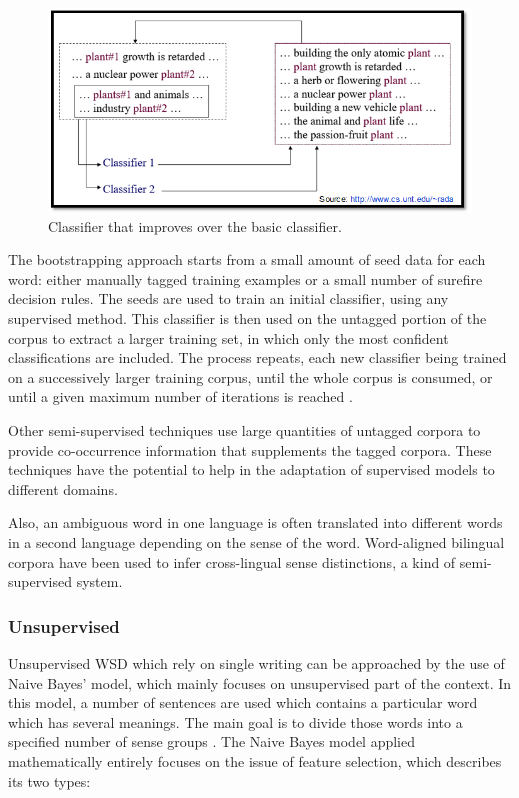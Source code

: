 \begin{figure}[tbh]
	\begin{center}
		\includegraphics[width=\columnwidth]{Union_Background_Chart_semi}
	\end{center}
	\caption{Classifier that improves over the basic classifier. \label{fig3}}
\end{figure}

The bootstrapping approach starts from a small amount of seed data for each word: either manually tagged training examples or a small number of surefire decision rules. The seeds are used to train an initial classifier, using any supervised method. This classifier is then used on the untagged portion of the corpus to extract a larger training set, in which only the most confident classifications are included. The process repeats, each new classifier being trained on a successively larger training corpus, until the whole corpus is consumed, or until a given maximum number of iterations is reached \cite{Blascheck2016}.

Other semi-supervised techniques use large quantities of untagged corpora to provide co-occurrence information that supplements the tagged corpora. These techniques have the potential to help in the adaptation of supervised models to different domains.

Also, an ambiguous word in one language is often translated into different words in a second language depending on the sense of the word. Word-aligned bilingual corpora have been used to infer cross-lingual sense distinctions, a kind of semi-supervised system\cite{Cheslow2014}.

\subsubsection*{Unsupervised}

Unsupervised WSD which rely on single writing can be approached by the use of Naive Bayes' model, which mainly focuses on unsupervised part of the context. In this model, a number of sentences are used which contains a particular word which has several meanings. The main goal is to divide those words into a specified number of sense groups \cite{4028513}.
The Naive Bayes model applied mathematically entirely focuses on the issue of feature selection, which describes its two types:

